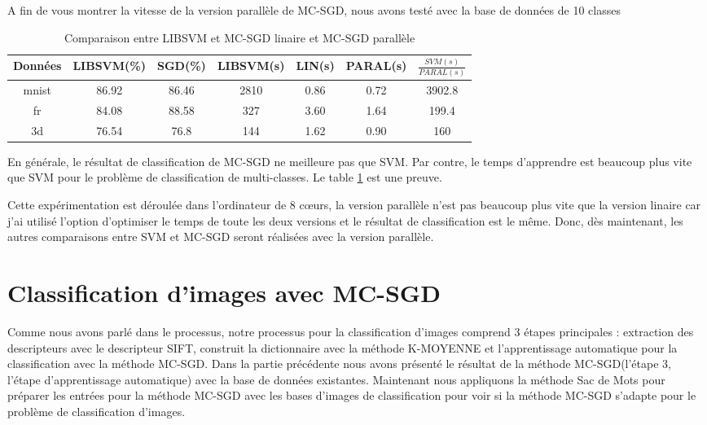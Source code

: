 A fin de vous montrer la vitesse de la version parallèle de MC-SGD, nous avons testé avec la base de données de 10 classes\\

\begin{table}[h]
\begin{center}
    \begin{tabular}{ | c | c | c | c | c | c | c |}
    \hline
    Données & LIBSVM(\%) & SGD(\%) & LIBSVM(s) & LIN(s) & PARAL(s) & $\frac{SVM(s)}{PARAL(s)}$ \\ \hline
    
    mnist & 86.92 & 86.46 & 2810 & 0.86 & 0.72 & 3902.8 \\ \hline
    
    fr & 84.08 & 88.58 & 327 & 3.60 & 1.64 & 199.4 \\ \hline
    
    3d & 76.54 & 76.8 & 144 & 1.62 & 0.90 & 160 \\ \hline
    
    \end{tabular}
\end{center}
\caption{Comparaison entre LIBSVM et MC-SGD linaire et MC-SGD parallèle}
\label{tab:pmcsvm}
\end{table}


En générale, le résultat de classification de MC-SGD ne meilleure pas que SVM. Par contre, le temps d'apprendre est beaucoup plus vite que SVM pour le problème de classification de multi-classes. Le table \ref{tab:pmcsvm} est une preuve.

Cette expérimentation est déroulée dans l'ordinateur de 8 cœurs, la version parallèle n'est pas beaucoup plus vite que la version linaire car j'ai utilisé l'option d'optimiser le temps de toute les deux versions et le résultat de classification est le même. Donc, dès maintenant, les autres comparaisons entre SVM et MC-SGD seront réalisées avec la version parallèle.


\section{Classification d'images avec MC-SGD}
Comme nous avons parlé dans le processus, notre processus pour la classification d'images comprend 3 étapes principales : extraction des descripteurs avec le descripteur SIFT, construit la dictionnaire avec la méthode K-MOYENNE et l'apprentissage automatique pour la classification avec la méthode MC-SGD. Dans la partie précédente nous avons présenté le résultat de la méthode MC-SGD(l'étape 3, l'étape d'apprentissage automatique) avec la base de données existantes. Maintenant nous appliquons la méthode Sac de Mots pour préparer les entrées pour la méthode MC-SGD avec les bases d'images de classification pour voir si la méthode MC-SGD s'adapte pour le problème de classification d'images.


